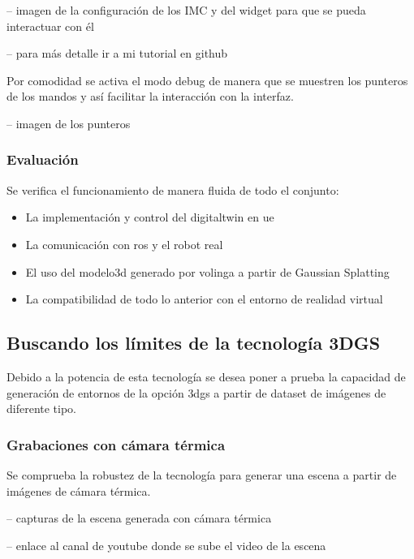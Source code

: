 \documentclass[a4paper, 12pt, spanish, twoside]{article}
\begin{document}
-- imagen de la configuración de los IMC y del widget para que se pueda interactuar con él  

-- para más detalle ir a mi tutorial en github 

Por comodidad se activa el modo \gls{debug} de manera que se muestren los punteros de los mandos y así facilitar la interacción con la interfaz. 

-- imagen de los punteros 

\subsubsection{Evaluación} \label{sec:implementacion:3dgs-volinga:evaluacion}

Se verifica el funcionamiento de manera fluida de todo el conjunto: 

\begin{itemize} 
\item La implementación y control del \gls{digitaltwin} en \acrshort{ue} 
\item La comunicación con \acrshort{ros} y el robot real 
\item El uso del \gls{modelo3d} generado por \gls{volinga} a partir de Gaussian Splatting 
\item La compatibilidad de todo lo anterior con el entorno de realidad virtual 
\end{itemize} 

\subsection{Buscando los límites de la tecnología 3DGS} \label{sec:implementacion:limites-3dgs}

Debido a la potencia de esta tecnología se desea poner a prueba la capacidad de generación de entornos de la opción \acrshort{3dgs} a partir de \gls{dataset} de imágenes de diferente tipo. 

\subsubsection {Grabaciones con cámara térmica} \label{sec:implementacion:limites-3dgs:termica}

Se comprueba la robustez de la tecnología para generar una escena a partir de imágenes de cámara térmica. 

-- capturas de la escena generada con cámara térmica 

-- enlace al canal de youtube donde se sube el video de la escena 
\end{document}
